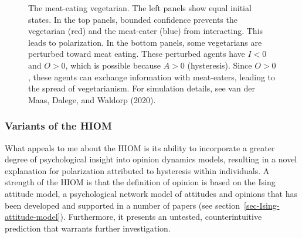 \documentclass[
  a4paper,
  DIV=11,
  numbers=noendperiod,
  oneside]{scrreprt}
\begin{document}
\begin{figure}


\caption{\label{fig-ch7-img12-old-100}The meat-eating vegetarian. The
left panels show equal initial states. In the top panels, bounded
confidence prevents the vegetarian (red) and the meat-eater (blue) from
interacting. This leads to polarization. In the bottom panels, some
vegetarians are perturbed toward meat eating. These perturbed agents
have \(I < 0\) and \(O > 0\), which is possible because \(A > 0\)
(hysteresis). Since \(O > 0\), these agents can exchange information
with meat-eaters, leading to the spread of vegetarianism. For simulation
details, see van der Maas, Dalege, and Waldorp (2020).}

\end{figure}%

\subsubsection{Variants of the HIOM}\label{sec-Variants-of-the-HIOM}

What appeals to me about the HIOM is its ability to incorporate a
greater degree of psychological insight into opinion dynamics models,
resulting in a novel explanation for polarization attributed to
hysteresis within individuals. A strength of the HIOM is that the
definition of opinion is based on the Ising attitude model, a
psychological network model of attitudes and opinions that has been
developed and supported in a number of papers (see
section~\ref{sec-Ising-attitude-model}). Furthermore, it presents an
untested, counterintuitive prediction that warrants further
investigation.
\end{document}
